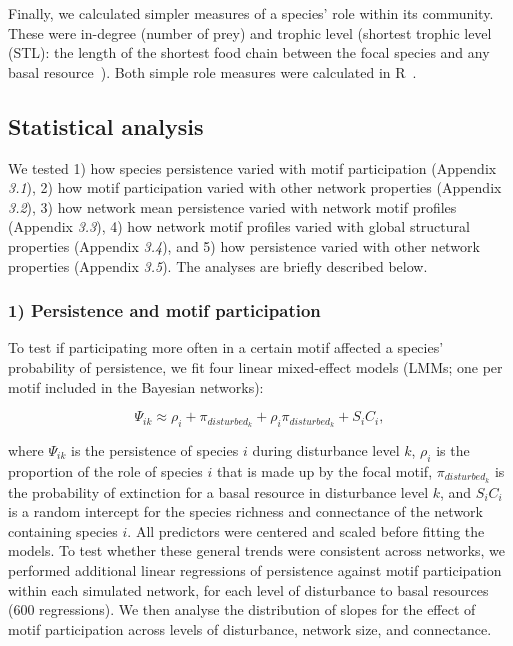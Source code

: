 \documentclass[12pt]{article}
\begin{document}
\begin{spacing}{2.0}
        Finally, we calculated simpler measures of a species' role within its community.
        These were in-degree (number of prey) and trophic level (shortest trophic level (STL): the length of the shortest food chain between the focal species and any basal resource~\citep{Williams2004}).
        Both simple role measures were calculated in R~\citep{R}.
        


	\subsection*{Statistical analysis} 

	We tested 1) how species persistence varied with motif participation (Appendix \emph{3.1}), 2) how motif participation varied with other network properties (Appendix \emph{3.2}), 3) how network mean persistence varied with network motif profiles (Appendix \emph{3.3}), 4) how network motif profiles varied with global structural properties (Appendix \emph{3.4}), and 5) how persistence varied with other network properties (Appendix \emph{3.5}). The analyses are briefly described below. 

    
    \subsubsection*{1) Persistence and motif participation}

        To test if participating more often in a certain motif affected a species' probability of persistence, we fit four linear mixed-effect models (LMMs; one per motif included in the Bayesian networks):       
            
            \begin{equation}
                \Psi_{ik} \approx \rho_{i} + \pi_{disturbed_k} + \rho_{i}\pi_{disturbed_k} +
                S_{i}C_{i} ,
                \label{propreq}
            \end{equation}

        where $\Psi_{ik}$ is the persistence of species $i$ during disturbance level $k$, $\rho_{i}$ is the proportion of the role of species $i$ that is made up by the focal motif, $\pi_{disturbed_k}$ is the probability of extinction for a basal resource in disturbance level $k$, and $S_{i}C_{i}$ is a random intercept for the species richness and connectance of the network containing species $i$.
        All predictors were centered and scaled before fitting the models.         
        To test whether these general trends were consistent across networks, we performed additional linear regressions of persistence against motif participation within each simulated network, for each level of disturbance to basal resources (600 regressions). 
        We then analyse the distribution of slopes for the effect of motif participation across levels of disturbance, network size, and connectance.    
    

\end{spacing}
\end{document}
